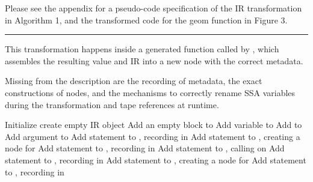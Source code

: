 Please see the appendix for a pseudo-code specification of the IR transformation in Algorithm 1, and
the transformed code for the geom function in Figure 3.

\begin{algorithm}[p]
  \hrule\footnotesize
  \smallskip
  This transformation happens inside a generated function called by , which
  assembles the resulting value and IR into a new node with the correct metadata.
  \par\vspace{\baselineskip}
  Missing from the description are the recording of metadata, the exact constructions of nodes, and
  the mechanisms to correctly rename SSA variables during the transformation and tape references at
  runtime.
  \begin{algorithmic}
    \State Initialize  \Comment create empty IR object
    \State Add an empty block  to 
    \State Add variable  to 
    \EndIf
    \State Add  to 
    \EndFor
    \State Add argument  to 
    \State Add statement to , recording  in 
    \EndIf
    \State Add statement  to , creating a node for 
    \State Add statement to , recording  in 
    \EndFor
    \State Add statement  to , calling  on 
    \State Add statement to , recording  in 
    \State Add statement  to , creating a node for 
    \State Add statement to , recording  in 
    \EndIf
    \EndFor

\end{algorithmic}
\end{algorithm}
